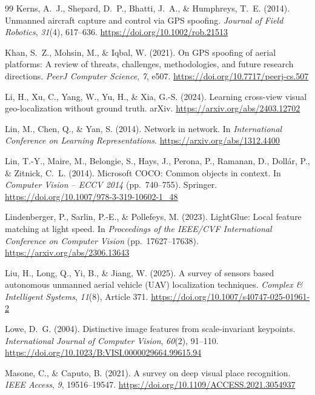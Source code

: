 \documentclass[english, Lau, oneside]{sapthesis}%
\begin{document}
\begin{thebibliography}{99}
Kerns, A.~J., Shepard, D.~P., Bhatti, J.~A., \& Humphreys, T.~E. (2014).
Unmanned aircraft capture and control via GPS spoofing.
\textit{Journal of Field Robotics}, \textit{31}(4), 617--636. \url{https://doi.org/10.1002/rob.21513}

Khan, S.~Z., Mohsin, M., \& Iqbal, W. (2021).
On GPS spoofing of aerial platforms: A review of threats, challenges, methodologies, and future research directions.
\textit{PeerJ Computer Science}, \textit{7}, e507. \url{https://doi.org/10.7717/peerj-cs.507}

Li, H., Xu, C., Yang, W., Yu, H., \& Xia, G.-S. (2024).
Learning cross-view visual geo-localization without ground truth.
arXiv. \url{https://arxiv.org/abs/2403.12702}

Lin, M., Chen, Q., \& Yan, S. (2014).
Network in network.
In \textit{International Conference on Learning Representations}. \url{https://arxiv.org/abs/1312.4400}

Lin, T.-Y., Maire, M., Belongie, S., Hays, J., Perona, P., Ramanan, D., Doll{\'a}r, P., \& Zitnick, C.~L. (2014).
Microsoft COCO: Common objects in context.
In \textit{Computer Vision -- ECCV 2014} (pp.~740--755). Springer. \url{https://doi.org/10.1007/978-3-319-10602-1_48}

Lindenberger, P., Sarlin, P.-E., \& Pollefeys, M. (2023).
LightGlue: Local feature matching at light speed.
In \textit{Proceedings of the IEEE/CVF International Conference on Computer Vision} (pp.~17627--17638). \url{https://arxiv.org/abs/2306.13643}

Liu, H., Long, Q., Yi, B., \& Jiang, W. (2025).
A survey of sensors based autonomous unmanned aerial vehicle (UAV) localization techniques.
\textit{Complex \& Intelligent Systems}, \textit{11}(8), Article 371. \url{https://doi.org/10.1007/s40747-025-01961-2}

Lowe, D.~G. (2004).
Distinctive image features from scale-invariant keypoints.
\textit{International Journal of Computer Vision}, \textit{60}(2), 91--110. \url{https://doi.org/10.1023/B:VISI.0000029664.99615.94}

Masone, C., \& Caputo, B. (2021).
A survey on deep visual place recognition.
\textit{IEEE Access}, \textit{9}, 19516--19547. \url{https://doi.org/10.1109/ACCESS.2021.3054937}


\end{thebibliography}
\end{document}
